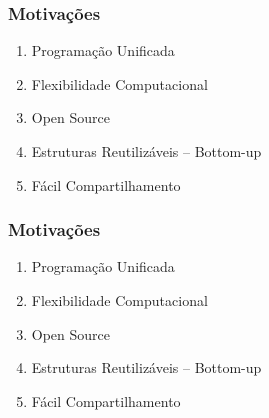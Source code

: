 \documentclass{beamer}
\begin{document}
\begin{frame}
  \frametitle{Motivações}

  \begin{enumerate}
  \item<1->[\ding{98}]{Programação Unificada}
  \item<5->[\ding{168}]{Flexibilidade Computacional}
  \item<2->[\ding{170}]{Open Source}
  \item<3->[\ding{171}]{Estruturas Reutilizáveis -- Bottom-up}
  \item<4->[\ding{169}]{Fácil Compartilhamento}
  \end{enumerate}

\end{frame}


\begin{frame}
  \frametitle{Motivações}

  \begin{enumerate}
  \item<1->[{\textcolor{yellow!90!black}{\ding{98}}}]{Programação Unificada}
  \item<5->[\ding{168}]{Flexibilidade Computacional}
  \item<2->[{\textcolor{red}{\ding{170}}}]{Open Source}
  \item<3->[\ding{171}]{Estruturas Reutilizáveis -- Bottom-up}
  \item<4->[{\textcolor{red}{\ding{169}}}]{Fácil Compartilhamento}
  \end{enumerate}

\end{frame}
\end{document}
